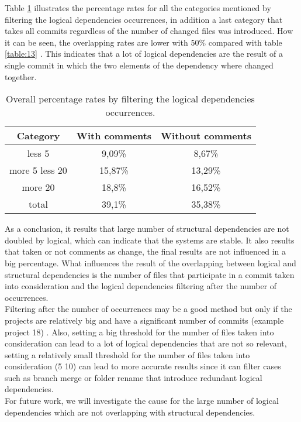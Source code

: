 Table \ref{table:14}  illustrates the percentage rates for all the categories mentioned by filtering the logical dependencies occurrences, in addition a last category that takes all commits regardless of the number of changed files was introduced. How it can be seen, the overlapping rates are lower with 50\% compared with table \ref{table:13} . This indicates that a lot of logical dependencies are the result of a single commit in which the two elements of the dependency where changed together.


\begin{table}
  \centering
  \begin{tabular}{@{}c||cc@{}}
    \toprule
       Category & With comments & Without comments  \\
    \midrule
less 5	&	9,09\% &	8,67\%	\\
more 5 less 20	&	15,87\% &	13,29\%\\
more 20	&	18,8\%	&	16,52\%\\
total &39,1\% & 35,38\% \\
    \bottomrule
  \end{tabular}
  \caption{Overall percentage rates by filtering the logical dependencies occurrences. }
   \label{table:14}
\end{table}

As a conclusion, it results that large number of structural dependencies are not doubled by logical, which can indicate that the systems are stable. It also results that taken or not comments as change, the final results are not influenced in a big percentage. What influences the result of the overlapping between logical and structural dependencies is the number of files that participate in a commit taken into consideration and the logical dependencies filtering after the number of occurrences.\\
Filtering after the number of occurrences may be a good method but only if the projects are relatively big and have a significant number of commits (example project 18) . Also, setting a big threshold for the number of files taken into consideration can lead to a lot of logical dependencies that are not so relevant, setting a relatively small threshold for the number of files taken into consideration (5 10) can lead to more accurate results since it can filter cases such as branch merge or folder rename that introduce redundant logical dependencies.\\
\tab For future work, we will investigate the cause for the large number of logical dependencies which are not overlapping with structural dependencies.
